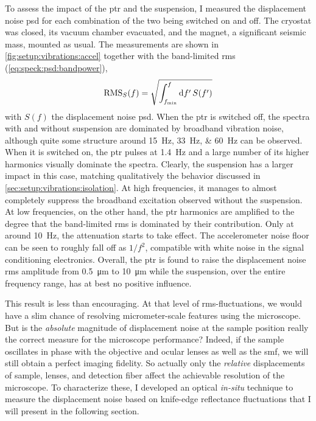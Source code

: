 To assess the impact of the \gls{ptr} and the suspension, I measured the displacement noise \gls{psd} for each combination of the two being switched on and off.
The cryostat was closed, its vacuum chamber evacuated, and the magnet, a significant seismic mass, mounted as usual.
The measurements are shown in \cref{fig:setup:vibrations:accel} together with the band-limited \gls{rms} (\cf \cref{eq:speck:psd:bandpower}),
\begin{equation}\label{eq:setup:vibrations:rms}
    \operatorname{RMS}_S(f) = \sqrt{\int_{f_{\mathrm{min}}}^{f}\dd{f^\prime}S(f^\prime)}
\end{equation}
with $S(f)$ the displacement noise \gls{psd}.
When the \gls{ptr} is switched off, the spectra with and without suspension are dominated by broadband vibration noise, although quite some structure around \qtylist{15;33;60}{\hertz} can be observed.
When it is switched on, the \gls{ptr} pulses at \qty{1.4}{\hertz} and a large number of its higher harmonics visually dominate the spectra.
Clearly, the suspension has a larger impact in this case, matching qualitatively the behavior discussed in \cref{sec:setup:vibrations:isolation}.
At high frequencies, it manages to almost completely suppress the broadband excitation observed without the suspension.
At low frequencies, on the other hand, the \gls{ptr} harmonics are amplified to the degree that the band-limited \gls{rms} is dominated by their contribution.
Only at around \qty{10}{\hertz}, the attenuation starts to take effect.
The accelerometer noise floor can be seen to roughly fall off as $1/f^2$, compatible with white noise in the signal conditioning electronics.
Overall, the \gls{ptr} is found to raise the displacement noise \gls{rms} amplitude from \qty{0.5}{\micro\meter} to \qty{10}{\micro\meter} while the suspension, over the entire frequency range, has at best no positive influence.

This result is less than encouraging.
At that level of \gls{rms}-fluctuations, we would have a slim chance of resolving micrometer-scale features using the microscope.
But is the \emph{absolute} magnitude of displacement noise at the sample position really the correct measure for the microscope performance?
Indeed, if the sample oscillates in phase with the objective and ocular lenses as well as the \gls{smf}, we will still obtain a perfect imaging fidelity.
So actually only the \emph{relative} displacements of sample, lenses, and detection fiber affect the achievable resolution of the microscope.
To characterize these, I developed an optical \emph{in-situ} technique to measure the displacement noise based on knife-edge reflectance fluctuations that I will present in the following section.

